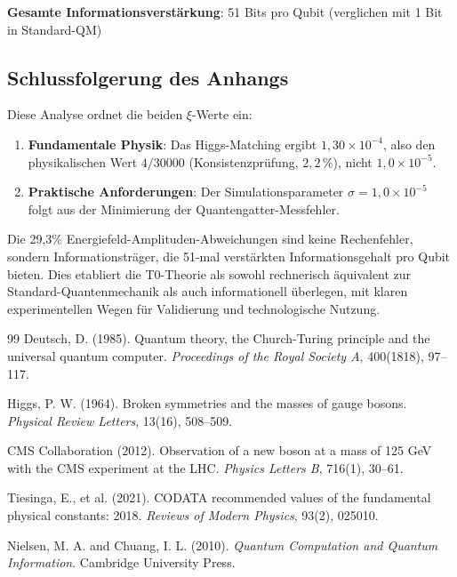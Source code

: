 	\textbf{Gesamte Informationsverstärkung}: 51 Bits pro Qubit (verglichen mit 1 Bit in Standard-QM)
	

	\subsection{Schlussfolgerung des Anhangs}
	
	Diese Analyse ordnet die beiden $\xi$-Werte ein:
	\begin{enumerate}
		\item \textbf{Fundamentale Physik}: Das Higgs-Matching ergibt $1{,}30 \times 10^{-4}$, also den physikalischen Wert $4/30000$ (Konsistenzprüfung, $2{,}2\,\%$), nicht $1{,}0 \times 10^{-5}$.
		\item \textbf{Praktische Anforderungen}: Der Simulationsparameter $\sigma = 1{,}0 \times 10^{-5}$ folgt aus der Minimierung der Quantengatter-Messfehler.
	\end{enumerate}
	
	Die 29,3\% Energiefeld-Amplituden-Abweichungen sind keine Rechenfehler, sondern Informationsträger, die 51-mal verstärkten Informationsgehalt pro Qubit bieten. Dies etabliert die T0-Theorie als sowohl rechnerisch äquivalent zur Standard-Quantenmechanik als auch informationell überlegen, mit klaren experimentellen Wegen für Validierung und technologische Nutzung.
	
	\begin{thebibliography}{99}
		Deutsch, D. (1985). Quantum theory, the Church-Turing principle and the universal quantum computer. \textit{Proceedings of the Royal Society A}, 400(1818), 97--117.
		
		Higgs, P. W. (1964). Broken symmetries and the masses of gauge bosons. \textit{Physical Review Letters}, 13(16), 508--509.
		
		CMS Collaboration (2012). Observation of a new boson at a mass of 125 GeV with the CMS experiment at the LHC. \textit{Physics Letters B}, 716(1), 30--61.
		
		Tiesinga, E., et al. (2021). CODATA recommended values of the fundamental physical constants: 2018. \textit{Reviews of Modern Physics}, 93(2), 025010.
		
		Nielsen, M. A. and Chuang, I. L. (2010). \textit{Quantum Computation and Quantum Information}. Cambridge University Press.
	\end{thebibliography}
	